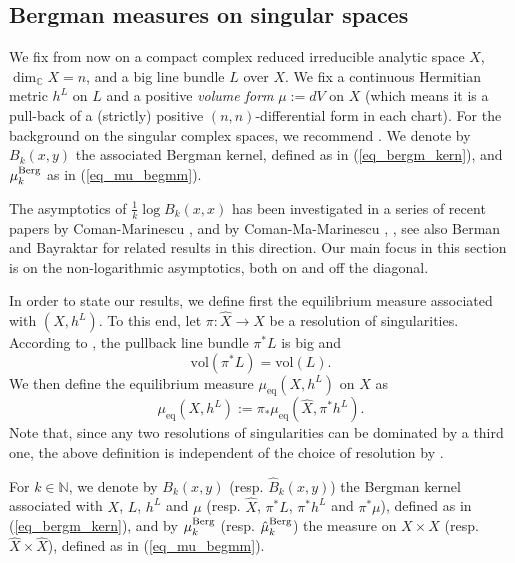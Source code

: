 \documentclass[12pt]{article}
\numberwithin{equation}{section}
\theoremstyle{theorem}
\theoremstyle{definition}
\theoremstyle{remark}
\newcommand{\comp}{\mathbb{C}}
\newcommand{\nat}{\mathbb{N}}
\begin{document}
	\subsection{Bergman measures on singular spaces}\label{sect_sing}
	We fix from now on a compact complex reduced irreducible analytic space $X$, $\dim_{\comp} X = n$, and a big line bundle $L$ over $X$.
	We fix a continuous Hermitian metric $h^L$ on $L$ and a positive \textit{volume form} $\mu := dV$ on $X$ (which means it is a pull-back of a (strictly) positive $(n, n)$-differential form in each chart).
	For the background on the singular complex spaces, we recommend \cite[\S II.9]{DemCompl}.
	We denote by $B_k(x, y)$ the associated Bergman kernel, defined as in (\ref{eq_bergm_kern}), and $\mu_k^{\rm{Berg}}$ as in (\ref{eq_mu_begmm}).
	\par 
	The asymptotics of $\frac{1}{k} \log B_k(x, x)$ has been investigated in a series of recent papers by Coman-Marinescu \cite{ComMar}, and by Coman-Ma-Marinescu \cite{ComanMaMarinGT}, \cite{ComanMaMarMoish}, see also Berman \cite[Theorem 1.5]{BermanEnvProj} and Bayraktar \cite[Proposition 2.9]{BayraktarEquidistr} for related results in this direction.  
	Our main focus in this section is on the non-logarithmic asymptotics, both on and off the diagonal.
	\par 
	In order to state our results, we define first the equilibrium measure associated with $(X, h^L)$.  
	To this end, let $\pi : \hat{X} \to X$ be a resolution of singularities.  
	According to \cite[Proposition 2.2.43]{LazarBookI}, the pullback line bundle $\pi^* L$ is big and
	\begin{equation}\label{eq_vol_resol}
    	\mathrm{vol}(\pi^* L) = \mathrm{vol}(L).
	\end{equation}
	We then define the equilibrium measure $\mu_{\mathrm{eq}}(X, h^L)$ on $X$ as
	\begin{equation}\label{eq_defn_eq_sing}
    	\mu_{\mathrm{eq}}(X, h^L) := \pi_* \mu_{\mathrm{eq}}(\hat{X}, \pi^* h^L).
	\end{equation}
	Note that, since any two resolutions of singularities can be dominated by a third one, the above definition is independent of the choice of resolution by \cite[Proposition 1.9]{BermanBouckBalls}.
	\par 
	For $k \in \nat$, we denote by $B_k(x, y)$ (resp. $\hat{B}_k(x, y)$) the Bergman kernel associated with $X$, $L$, $h^L$ and $\mu$ (resp. $\hat{X}$, $\pi^* L$, $\pi^* h^L$ and $\pi^* \mu$), defined as in (\ref{eq_bergm_kern}), and by $\mu_k^{\rm{Berg}}$ (resp. $\hat{\mu}_k^{\rm{Berg}}$) the measure on $X \times X$ (resp. $\hat{X} \times \hat{X}$), defined as in (\ref{eq_mu_begmm}).
\end{document}
